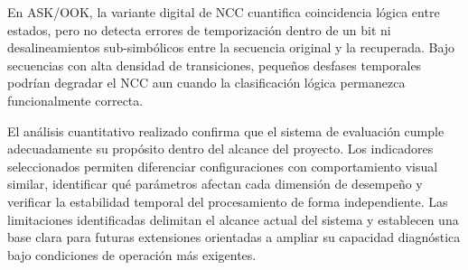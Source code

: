 En ASK/OOK, la variante digital de NCC cuantifica coincidencia lógica entre estados, pero no detecta errores de temporización dentro de un bit ni desalineamientos sub-simbólicos entre la secuencia original y la recuperada. Bajo secuencias con alta densidad de transiciones, pequeños desfases temporales podrían degradar el NCC aun cuando la clasificación lógica permanezca funcionalmente correcta.

El análisis cuantitativo realizado confirma que el sistema de evaluación cumple adecuadamente su propósito dentro del alcance del proyecto. Los indicadores seleccionados permiten diferenciar configuraciones con comportamiento visual similar, identificar qué parámetros afectan cada dimensión de desempeño y verificar la estabilidad temporal del procesamiento de forma independiente. Las limitaciones identificadas delimitan el alcance actual del sistema y establecen una base clara para futuras extensiones orientadas a ampliar su capacidad diagnóstica bajo condiciones de operación más exigentes.